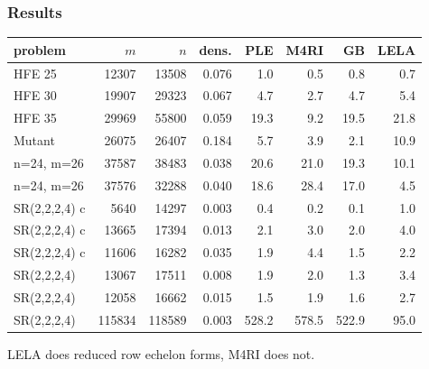 \documentclass[11pt]{beamer}
\begin{document}
\begin{frame}[allowframebreaks]
\frametitle{Results}


\begin{footnotesize}
\begin{center}
\begin{tabular}{|l|r|r|r|r|r|r||r|}
\hline
problem  & $m$ & $n$ &  dens. &  PLE & M4RI & GB & LELA\\
\hline        
HFE 25        &   12307 & 13508 & 0.076 &                1.0 &  {\color{pink} 0.5}&                  0.8 &   0.7\\
HFE 30        &   19907 & 29323 & 0.067 &                4.7 &  {\color{pink} 2.7}&                  4.7 &   5.4\\
HFE 35        &   29969 & 55800 & 0.059 &               19.3 &  {\color{pink} 9.2}&                 19.5 &  21.8\\
Mutant        &   26075 & 26407 & 0.184 &                5.7 &                3.9 &   {\color{pink}  2.1}&  10.9\\
n=24, m=26    &   37587 & 38483 & 0.038 &               20.6 &               21.0 &   {\color{pink} 19.3}&  10.1\\
n=24, m=26    &   37576 & 32288 & 0.040 &               18.6 &               28.4 &   {\color{pink} 17.0}&   4.5\\
SR(2,2,2,4) c &    5640 & 14297 & 0.003 &                0.4 &                0.2 &   {\color{pink}  0.1}&   1.0\\
SR(2,2,2,4) c &   13665 & 17394 & 0.013 &                2.1 &                3.0 &   {\color{pink}  2.0}&   4.0\\
SR(2,2,2,4) c &   11606 & 16282 & 0.035 &                1.9 &                4.4 &   {\color{pink}  1.5}&   2.2\\
SR(2,2,2,4)   &   13067 & 17511 & 0.008 &                1.9 &                2.0 &   {\color{pink}  1.3}&   3.4\\
SR(2,2,2,4)   &   12058 & 16662 & 0.015 &  {\color{pink} 1.5}&                1.9 &                  1.6 &   2.7\\
SR(2,2,2,4)   &  115834 &118589 & 0.003 &              528.2 &              578.5 &  {\color{pink} 522.9}&  95.0\\
\hline
\end{tabular}
\end{center}
\end{footnotesize}

\begin{block}{}
LELA does reduced row echelon forms, M4RI does not.
\end{block}


\end{frame}
\end{document}
